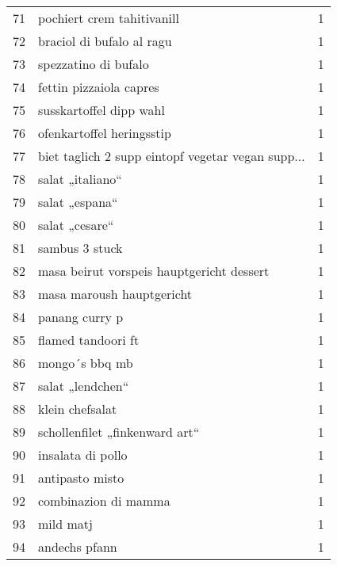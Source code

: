 \begin{tabular}{llr}
71  &                         pochiert crem tahitivanill &      1 \\
72  &                          braciol di bufalo al ragu &      1 \\
73  &                               spezzatino di bufalo &      1 \\
74  &                            fettin pizzaiola capres &      1 \\
75  &                            susskartoffel dipp wahl &      1 \\
76  &                          ofenkartoffel heringsstip &      1 \\
77  &  biet taglich 2 supp eintopf vegetar vegan supp... &      1 \\
78  &                                   salat „italiano“ &      1 \\
79  &                                     salat „espana“ &      1 \\
80  &                                     salat „cesare“ &      1 \\
81  &                                     sambus 3 stuck &      1 \\
82  &          masa beirut vorspeis hauptgericht dessert &      1 \\
83  &                          masa maroush hauptgericht &      1 \\
84  &                                     panang curry p &      1 \\
85  &                                 flamed tandoori ft &      1 \\
86  &                                     mongo´s bbq mb &      1 \\
87  &                                   salat „lendchen“ &      1 \\
88  &                                    klein chefsalat &      1 \\
89  &                     schollenfilet „finkenward art“ &      1 \\
90  &                                  insalata di pollo &      1 \\
91  &                                    antipasto misto &      1 \\
92  &                               combinazion di mamma &      1 \\
93  &                                          mild matj &      1 \\
94  &                                      andechs pfann &      1 \\

\end{tabular}
